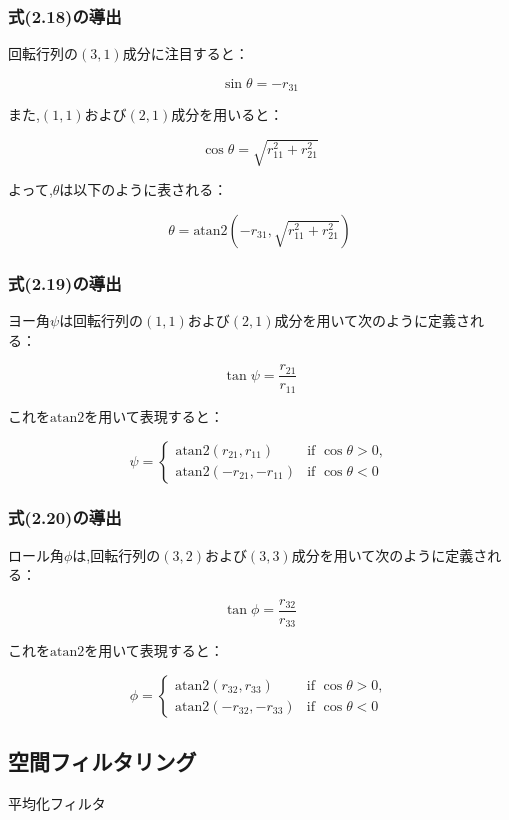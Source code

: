 \subsubsection{式(2.18)の導出}

回転行列の$(3,1)$成分に注目すると：

\[
  \sin \theta = -r_{31}
\]

また,$(1,1)$および$(2,1)$成分を用いると：

\[
  \cos \theta = \sqrt{r_{11}^2 + r_{21}^2}
\]

よって,$\theta$は以下のように表される：

\[
  \theta = \text{atan2} \left( -r_{31}, \sqrt{r_{11}^2 + r_{21}^2} \right) \tag{2.18}
\]

\subsubsection{式(2.19)の導出}

ヨー角$\psi$は回転行列の$(1,1)$および$(2,1)$成分を用いて次のように定義される：

\[
  \tan \psi = \frac{r_{21}}{r_{11}}
\]

これを$\text{atan2}$を用いて表現すると：

\[
  \psi = 
  \begin{cases}
    \text{atan2}(r_{21}, r_{11})   & \text{if } \cos \theta > 0, \\ 
    \text{atan2}(-r_{21}, -r_{11}) & \text{if } \cos \theta < 0
  \end{cases} \tag{2.19}
\]


\subsubsection{式(2.20)の導出}

ロール角$\phi$は,回転行列の$(3,2)$および$(3,3)$成分を用いて次のように定義される：

\[
  \tan \phi = \frac{r_{32}}{r_{33}}
\]

これを$\text{atan2}$を用いて表現すると：

\[
  \phi = 
  \begin{cases}
    \text{atan2}(r_{32}, r_{33})   & \text{if } \cos \theta > 0, \\ 
    \text{atan2}(-r_{32}, -r_{33}) & \text{if } \cos \theta < 0
  \end{cases} \tag{2.20}
\]



\subsection{空間フィルタリング}
平均化フィルタ

